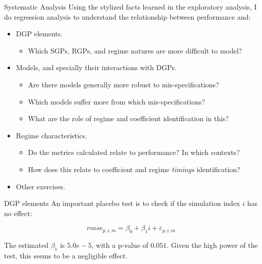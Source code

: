 \documentclass[
  ignorenonframetext,
]{beamer}
\providecommand{\tightlist}{%
  \setlength{\itemsep}{0pt}\setlength{\parskip}{0pt}}\usepackage{longtable,booktabs,array}
\begin{document}
\begin{frame}{Systematic Analysis}
\label{systematic-analysis-1}
Using the stylized facts learned in the exploratory analysis, I do
regression analysis to understand the relationship between performance
and:

\begin{itemize}
\tightlist
\item
  DGP elements.

  \begin{itemize}
  \tightlist
  \item
    Which SGPs, RGPs, and regime natures are more difficult to model?
  \end{itemize}
\item
  Models, and specially their interactions with DGPs.

  \begin{itemize}
  \tightlist
  \item
    Are there models generally more robust to mis-specifications?
  \item
    Which models suffer more from which mis-specifications?
  \item
    What are the role of regime and coefficient identification in this?
  \end{itemize}
\item
  Regime characteristics.

  \begin{itemize}
  \tightlist
  \item
    Do the metrics calculated relate to performance? In which contexts?
  \item
    How does this relate to coefficient and regime \emph{timings}
    identification?
  \end{itemize}
\item
  Other exercises.
\end{itemize}
\end{frame}

\begin{frame}{DGP elements}
\label{dgp-elements}
An important placebo test is to check if the simulation index \(i\) has
no effect:

\begin{equation}
    rmse_{p, i, m} = \beta_0 + \beta_1 i + \varepsilon_{p, i, m}
\end{equation}

The estimated \(\beta_1\) is \(5.0e-5\), with a p-value of \(0.051\).
Given the high power of the test, this seems to be a negligible effect.
\end{frame}
\end{document}
